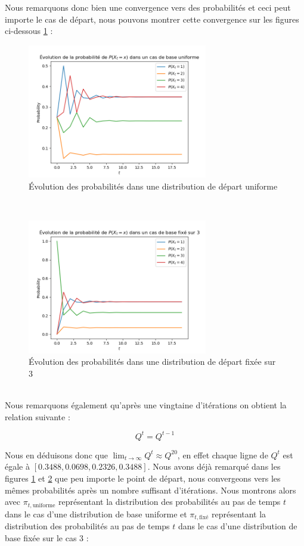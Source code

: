 Nous remarquons donc bien une convergence vers des probabilités et ceci peut importe le cas de départ, nous pouvons montrer cette convergence sur les figures ci-dessous \ref{fig:unif} :
\begin{figure}[h!]
  \centering
  \includegraphics[width=0.7\textwidth]{figs/evo_unif.png}
  \caption{Évolution des probabilités dans une distribution de départ uniforme}
  \label{fig:unif}
\end{figure}
\\
\begin{figure}[h!]
  \centering
  \includegraphics[width=0.7\textwidth]{figs/evo_fixed.png}
  \caption{Évolution des probabilités dans une distribution de départ fixée sur 3}
  \label{fig:fixed}
\end{figure}
\\
Nous remarquons également qu'après une vingtaine d'itérations on obtient la relation suivante :

\begin{equation*}
  Q^t = Q^{t-1}
\end{equation*}

Nous en déduisons donc que $\lim_{t \rightarrow \infty} Q^t \approx Q^{20} $, en effet chaque ligne de $Q^t$ est égale à $[0.3488 , 0.0698 , 0.2326 , 0.3488]$. Nous avons déjà remarqué dans les figures \ref{fig:unif} et \ref{fig:fixed} que peu importe le 
point de départ, nous convergeons vers les mêmes probabilités après un nombre suffisant d'itérations. Nous montrons alors avec $\pi_{t,\text{uniforme}}$ représentant la distribution des probabilités au pas de temps $t$ dans le cas d'une 
distribution de base uniforme et $\pi_{t,\text{fixé}}$ représentant la distribution des probabilités au pas de temps $t$ dans le cas d'une 
distribution de base fixée sur le cas $3$ :  

